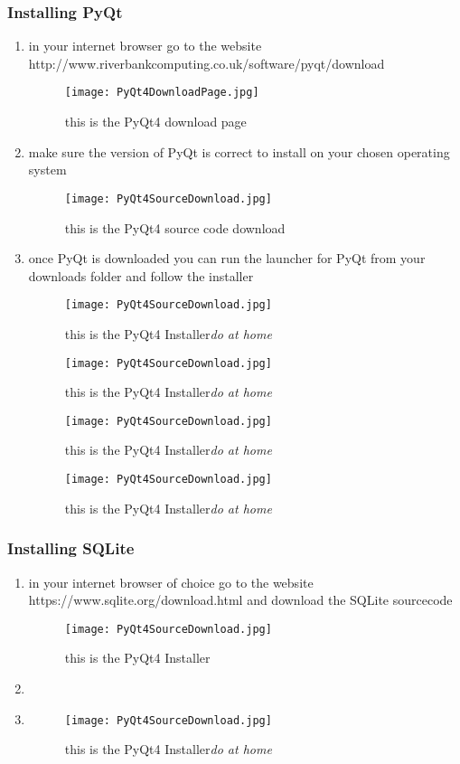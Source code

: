 \subsubsection{Installing PyQt}
\begin{enumerate}
\item in your internet browser go to the website\newline
http://www.riverbankcomputing.co.uk/software/pyqt/download
\begin{figure}
\texttt{[image: PyQt4DownloadPage.jpg]}
\caption{this is the PyQt4 download page\label{Pyth.PyQt4}}
\end{figure}
\item make sure the version of PyQt is correct to install on your chosen operating system 
\begin{figure}
\texttt{[image: PyQt4SourceDownload.jpg]}
\caption{this is the PyQt4 source code download\label{Pyth.PyQt4SC}}
\end{figure}
\item once PyQt is downloaded you can run the launcher for PyQt from your downloads folder and follow the installer
\begin{figure}
\texttt{[image: PyQt4SourceDownload.jpg]}
\caption{this is the PyQt4 Installer\emph{do at home}\label{Pyth.PyQt4ist1}}
\end{figure}
\begin{figure}
\texttt{[image: PyQt4SourceDownload.jpg]}
\caption{this is the PyQt4 Installer\emph{do at home}\label{Pyth.PyQt4ist2}}
\end{figure}
\begin{figure}
\texttt{[image: PyQt4SourceDownload.jpg]}
\caption{this is the PyQt4 Installer\emph{do at home}\label{Pyth.PyQt4ist3}}
\end{figure}
\begin{figure}
\texttt{[image: PyQt4SourceDownload.jpg]}
\caption{this is the PyQt4 Installer\emph{do at home}\label{Pyth.PyQt4ist4}}
\end{figure}
\end{enumerate}
\subsubsection{Installing SQLite}
\begin{enumerate}
\item in your internet browser of choice go to the website \newline
https://www.sqlite.org/download.html and download the SQLite sourcecode
\begin{figure}
\texttt{[image: PyQt4SourceDownload.jpg]}
\caption{this is the PyQt4 Installer\label{Pyth.PyQt4ist4}}
\end{figure}
\item 
\item 
\begin{figure}
\texttt{[image: PyQt4SourceDownload.jpg]}
\caption{this is the PyQt4 Installer\emph{do at home}\label{Pyth.PyQt4ist4}}
\end{figure}

\end{enumerate}
